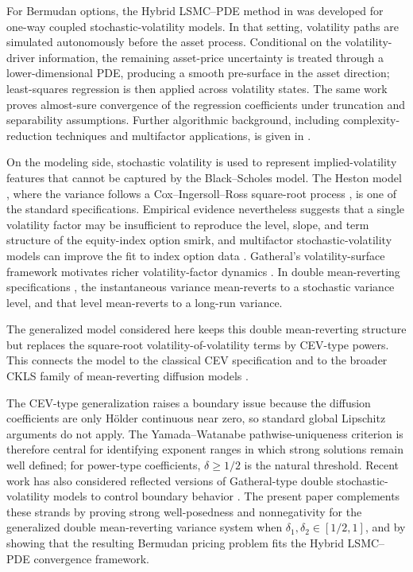 \documentclass[10pt]{article}
\theoremstyle{plain}
\theoremstyle{definition}
\theoremstyle{remark}
\begin{document}
For Bermudan options, the Hybrid LSMC--PDE method in \cite{farahany2020mixing} was developed for one-way coupled stochastic-volatility models. In that setting, volatility paths are simulated autonomously before the asset process. Conditional on the volatility-driver information, the remaining asset-price uncertainty is treated through a lower-dimensional PDE, producing a smooth pre-surface in the asset direction; least-squares regression is then applied across volatility states. The same work proves almost-sure convergence of the regression coefficients under truncation and separability assumptions. Further algorithmic background, including complexity-reduction techniques and multifactor applications, is given in \cite{farahany2019thesis}.

On the modeling side, stochastic volatility is used to represent implied-volatility features that cannot be captured by the Black--Scholes model. The Heston model \citep{heston1993closedform}, where the variance follows a Cox--Ingersoll--Ross square-root process \citep{cir1985termstructure}, is one of the standard specifications. Empirical evidence nevertheless suggests that a single volatility factor may be insufficient to reproduce the level, slope, and term structure of the equity-index option smirk, and multifactor stochastic-volatility models can improve the fit to index option data \cite{christoffersen2009smirk}. Gatheral's volatility-surface framework motivates richer volatility-factor dynamics \citep{gatheral2006volsurface}. In double mean-reverting specifications \citep{bayer2013fast}, the instantaneous variance mean-reverts to a stochastic variance level, and that level mean-reverts to a long-run variance.

The generalized model considered here keeps this double mean-reverting structure but replaces the square-root volatility-of-volatility terms by CEV-type powers. This connects the model to the classical CEV specification \citep{cox1975cev} and to the broader CKLS family of mean-reverting diffusion models \citep{chan1992empirical}.

The CEV-type generalization raises a boundary issue because the diffusion coefficients are only H\"older continuous near zero, so standard global Lipschitz arguments do not apply. The Yamada--Watanabe pathwise-uniqueness criterion \cite{yamada1971uniqueness} is therefore central for identifying exponent ranges in which strong solutions remain well defined; for power-type coefficients, $\delta\ge 1/2$ is the natural threshold. Recent work has also considered reflected versions of Gatheral-type double stochastic-volatility models to control boundary behavior \citep{mishura2025skorokhod}. The present paper complements these strands by proving strong well-posedness and nonnegativity for the generalized double mean-reverting variance system when $\delta_1,\delta_2\in[1/2,1]$, and by showing that the resulting Bermudan pricing problem fits the Hybrid LSMC--PDE convergence framework.
\end{document}
